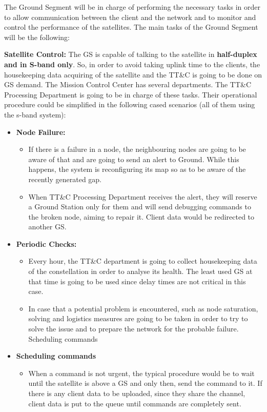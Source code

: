 The Ground Segment will be in charge of performing the necessary tasks in order to allow communication between the client and the network and to monitor and control the performance of the satellites. The main tasks of the Ground Segment will be the following:

\textbf{Satellite Control:} The GS is capable of talking to the satellite in \textbf{half-duplex and in S-band only}. So, in order to avoid taking uplink time to the clients, the housekeeping data acquiring of the satellite and the TT\&C is going to be done on GS demand. The Mission Control Center has several departments. The TT\&C Processing Department is going to be in charge of these tasks. Their operational procedure could be simplified in the following cased scenarios (all of them using the s-band system):

\begin{itemize}

\item \textbf{Node Failure:}
\begin{itemize}
\item If there is a failure in a node, the neighbouring nodes are going to be aware of that and are going to send an alert to Ground. While this happens, the system is reconfiguring its map so as to be aware of the recently generated gap.
\item When TT\&C Processing Department receives the alert, they will reserve a Ground Station only for them and will send debugging commands to the broken node, aiming to repair it. Client data would be redirected to another GS.
\end{itemize}

\item \textbf{Periodic Checks:}

\begin{itemize}
\item Every hour, the TT\&C department is going to collect housekeeping data of the constellation in order to analyse its health. The least used GS at that time is going to be used since delay times are not critical in this case.
\item In case that a potential problem is encountered, such as node saturation, solving and logistics measures are going to be taken in order to try to solve the issue and to prepare the network for the probable failure.
Scheduling commands
\end{itemize}

\item \textbf{Scheduling commands}

\begin{itemize}
\item When a command is not urgent, the typical procedure would be to wait until the satellite is above a GS and only then, send the command to it. If there is any client data to be uploaded, since they share the channel, client data is put to the queue until commands are completely sent.
\end{itemize}

\end{itemize}

